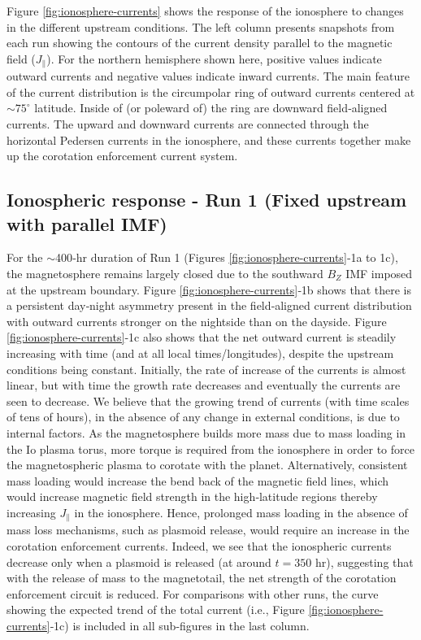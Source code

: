 Figure \ref{fig:ionosphere-currents} shows the response of the ionosphere to changes in the different upstream conditions. The left column presents snapshots from each run showing the contours of the current density parallel to the magnetic field ($J_\parallel$). For the northern hemisphere shown here, positive values indicate outward currents and negative values indicate inward currents. The main feature of the current distribution is the circumpolar ring of outward currents centered at $\sim75^\circ$ latitude. Inside of (or poleward of) the ring are downward field‐aligned currents. The upward and downward currents are connected through the horizontal Pedersen currents in the ionosphere, and these currents together make up the corotation enforcement current system. 

\subsection{Ionospheric response - Run 1 (Fixed upstream with parallel IMF)}

For the $\sim$400‐hr duration of Run 1 (Figures \ref{fig:ionosphere-currents}‐1a to 1c), the magnetosphere remains largely closed due to the southward $B_Z$ IMF imposed at the upstream boundary. Figure \ref{fig:ionosphere-currents}‐1b shows that there is a persistent day‐night asymmetry present in the field‐aligned current distribution with outward currents stronger on the nightside than on the dayside. Figure \ref{fig:ionosphere-currents}‐1c also shows that the net outward current is steadily increasing with time (and at all local times/longitudes), despite the upstream conditions being constant. Initially, the rate of increase of the currents is almost linear, but with time the growth rate decreases and eventually the currents are seen to decrease. We believe that the growing trend of currents (with time scales of tens of hours), in the absence of any change in external conditions, is due to internal factors. As the magnetosphere builds more mass due to mass loading in the Io plasma torus, more torque is required from the ionosphere in order to force the magnetospheric plasma to corotate with the planet. Alternatively, consistent mass loading would increase the bend back of the magnetic field lines, which would increase magnetic field strength in the high‐latitude regions thereby increasing $J_\parallel$ in the ionosphere. Hence, prolonged mass loading in the absence of mass loss mechanisms, such as plasmoid release, would require an increase in the corotation enforcement currents. Indeed, we see that the ionospheric currents decrease only when a plasmoid is released (at around $t = 350$ hr), suggesting that with the release of mass to the magnetotail, the net strength of the corotation enforcement circuit is reduced. For comparisons with other runs, the curve showing the expected trend of the total current (i.e., Figure \ref{fig:ionosphere-currents}‐1c) is included in all sub-figures in the last column. 

